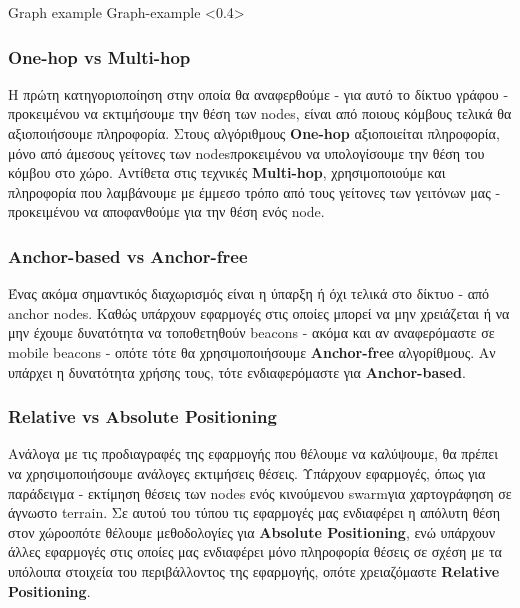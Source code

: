 {Graph example}%
{Graph-example}%
<0.4>

\subsubsection{One-hop vs Multi-hop}
Η πρώτη κατηγοριοποίηση στην οποία θα αναφερθούμε - για αυτό το δίκτυο γράφου - προκειμένου να εκτιμήσουμε την θέση των nodes, 
είναι από ποιους κόμβους τελικά θα αξιοποιήσουμε πληροφορία. Στους αλγόριθμους \textbf{One-hop} αξιοποιείται πληροφορία,
μόνο από άμεσους γείτονες των nodes\udot προκειμένου να υπολογίσουμε την θέση του κόμβου στο χώρο. Αντίθετα 
στις τεχνικές \textbf{Multi-hop}, χρησιμοποιούμε και πληροφορία που λαμβάνουμε με έμμεσο τρόπο\udot
από τους γείτονες των γειτόνων μας - προκειμένου να αποφανθούμε για την θέση ενός node.

\subsubsection{Anchor-based vs Anchor-free}
Ένας ακόμα σημαντικός διαχωρισμός είναι η ύπαρξη ή όχι τελικά στο δίκτυο - από anchor nodes. Καθώς υπάρχουν εφαρμογές
στις οποίες μπορεί να μην χρειάζεται ή να μην έχουμε δυνατότητα να τοποθετηθούν beacons - ακόμα και αν αναφερόμαστε σε mobile beacons -
οπότε τότε θα χρησιμοποιήσουμε \textbf{Anchor-free} αλγορίθμους. Αν υπάρχει η δυνατότητα χρήσης τους, τότε ενδιαφερόμαστε για
\textbf{Anchor-based}.

\subsubsection{Relative vs Absolute Positioning}
Ανάλογα με τις προδιαγραφές της εφαρμογής που θέλουμε να καλύψουμε, θα πρέπει να χρησιμοποιήσουμε ανάλογες εκτιμήσεις θέσεις.
Υπάρχουν εφαρμογές, όπως για παράδειγμα - εκτίμηση θέσεις των nodes ενός κινούμενου swarm\udot για χαρτογράφηση σε άγνωστο terrain. Σε αυτού 
του τύπου τις εφαρμογές μας ενδιαφέρει η απόλυτη θέση στον χώρο\udot οπότε θέλουμε μεθοδολογίες για \textbf{Absolute Positioning}, ενώ 
υπάρχουν άλλες εφαρμογές στις οποίες μας ενδιαφέρει μόνο πληροφορία θέσεις σε σχέση με τα υπόλοιπα στοιχεία του περιβάλλοντος της
εφαρμογής, οπότε χρειαζόμαστε \textbf{Relative Positioning}.

